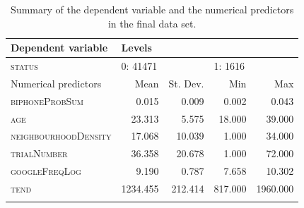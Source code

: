 \begin{table}\fontsize{10}{11}
\caption{Summary of the dependent variable and the numerical predictors in the final data set.}
\label{tab:7.5}
\centering
\begin{tabular}{lrrrr} 
\lsptoprule
Dependent variable   & \multicolumn{4}{l}{Levels}                                      \\ 
\midrule
\textsc{status}               & \multicolumn{2}{l}{0:
  41471} & \multicolumn{2}{l}{1:
  1616}  \\ 
\midrule
Numerical predictors & Mean     & St. Dev.            & Min     & Max                  \\ 
\midrule
\textsc{biphoneProbSum}       & 0.015    & 0.009               & 0.002   & 0.043                \\
\textsc{age}                  & 23.313   & 5.575               & 18.000  & 39.000               \\
\textsc{neighbourhoodDensity} & 17.068   & 10.039              & 1.000   & 34.000               \\
\textsc{trialNumber}          & 36.358   & 20.678              & 1.000   & 72.000               \\
\textsc{googleFreqLog}        & 9.190    & 0.787               & 7.658   & 10.302               \\
\textsc{tend}                 & 1234.455 & 212.414             & 817.000 & 1960.000             \\
\lspbottomrule
\end{tabular}
\end{table}





